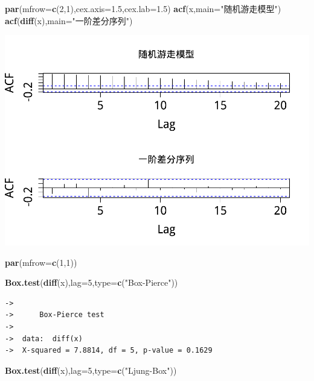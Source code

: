 \documentclass[]{article}
\newenvironment{Shaded}{\begin{snugshade}}{\end{snugshade}}
\newcommand{\KeywordTok}[1]{\textcolor[rgb]{0.13,0.29,0.53}{\textbf{{#1}}}}
\newcommand{\DataTypeTok}[1]{\textcolor[rgb]{0.13,0.29,0.53}{{#1}}}
\newcommand{\DecValTok}[1]{\textcolor[rgb]{0.00,0.00,0.81}{{#1}}}
\newcommand{\FloatTok}[1]{\textcolor[rgb]{0.00,0.00,0.81}{{#1}}}
\newcommand{\StringTok}[1]{\textcolor[rgb]{0.31,0.60,0.02}{{#1}}}
\newcommand{\NormalTok}[1]{{#1}}
\begin{document}
\begin{Shaded}
\begin{Highlighting}[]
\KeywordTok{par}\NormalTok{(}\DataTypeTok{mfrow=}\KeywordTok{c}\NormalTok{(}\DecValTok{2}\NormalTok{,}\DecValTok{1}\NormalTok{),}\DataTypeTok{cex.axis=}\FloatTok{1.5}\NormalTok{,}\DataTypeTok{cex.lab=}\FloatTok{1.5}\NormalTok{)}
\KeywordTok{acf}\NormalTok{(x,}\DataTypeTok{main=}\StringTok{"随机游走模型"}\NormalTok{)}
\KeywordTok{acf}\NormalTok{(}\KeywordTok{diff}\NormalTok{(x),}\DataTypeTok{main=}\StringTok{"一阶差分序列"}\NormalTok{)}
\end{Highlighting}
\end{Shaded}

\includegraphics{time_series_files/figure-latex/unnamed-chunk-1-2.pdf}

\begin{Shaded}
\begin{Highlighting}[]
\KeywordTok{par}\NormalTok{(}\DataTypeTok{mfrow=}\KeywordTok{c}\NormalTok{(}\DecValTok{1}\NormalTok{,}\DecValTok{1}\NormalTok{))}

\KeywordTok{Box.test}\NormalTok{(}\KeywordTok{diff}\NormalTok{(x),}\DataTypeTok{lag=}\DecValTok{5}\NormalTok{,}\DataTypeTok{type=}\KeywordTok{c}\NormalTok{(}\StringTok{"Box-Pierce"}\NormalTok{))}
\end{Highlighting}
\end{Shaded}

\begin{verbatim}
->  
->      Box-Pierce test
->  
->  data:  diff(x)
->  X-squared = 7.8814, df = 5, p-value = 0.1629
\end{verbatim}

\begin{Shaded}
\begin{Highlighting}[]
\KeywordTok{Box.test}\NormalTok{(}\KeywordTok{diff}\NormalTok{(x),}\DataTypeTok{lag=}\DecValTok{5}\NormalTok{,}\DataTypeTok{type=}\KeywordTok{c}\NormalTok{(}\StringTok{"Ljung-Box"}\NormalTok{))}
\end{Highlighting}
\end{Shaded}
\end{document}
